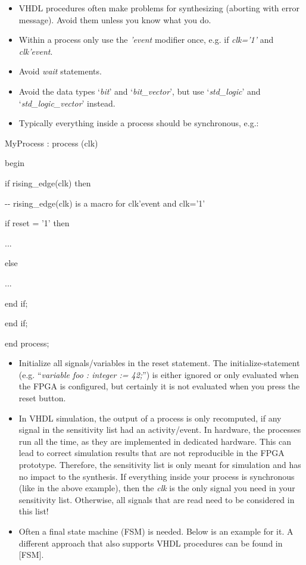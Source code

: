 \documentclass[
]{article}
\begin{document}
\begin{itemize}
\item
  VHDL procedures often make problems for synthesizing (aborting with
  error message). Avoid them unless you know what you do.
\item
  Within a process only use the \emph{'event} modifier once, e.g. if
  \emph{clk='1'} and \emph{clk'event}.
\item
  Avoid \emph{wait} statements.
\item
  Avoid the data types `\emph{bit}' and `\emph{bit\_vector}', but use
  `\emph{std\_logic}' and `\emph{std\_logic\_vector}' instead.
\item
  Typically everything inside a process should be synchronous, e.g.:
\end{itemize}

MyProcess : process (clk)

begin

if rising\_edge(clk) then

-\/- rising\_edge(clk) is a macro for clk'event and clk='1'

if reset = '1' then

...

else

...

end if;

end if;

end process;

\begin{itemize}
\item
  Initialize all signals/variables in the reset statement. The
  initialize-statement (e.g. ``\emph{variable foo : integer := 42;}'')
  is either ignored or only evaluated when the FPGA is configured, but
  certainly it is not evaluated when you press the reset button.
\item
  In VHDL simulation, the output of a process is only recomputed, if any
  signal in the sensitivity list had an activity/event. In hardware, the
  processes run all the time, as they are implemented in dedicated
  hardware. This can lead to correct simulation results that are not
  reproducible in the FPGA prototype. Therefore, the sensitivity list is
  only meant for simulation and has no impact to the synthesis. If
  everything inside your process is synchronous (like in the above
  example), then the \emph{clk} is the only signal you need in your
  sensitivity list. Otherwise, all signals that are read need to be
  considered in this list!
\item
  Often a final state machine (FSM) is needed. Below is an example for
  it. A different approach that also supports VHDL procedures can be
  found in {[}FSM{]}.
\end{itemize}
\end{document}

